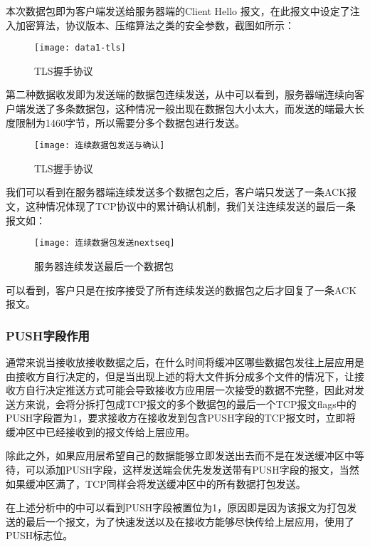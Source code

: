 \documentclass[lang=cn,11pt]{elegantpaper}
\begin{document}
本次数据包即为客户端发送给服务器端的Client  Hello 报文，在此报文中设定了注入加密算法，协议版本、压缩算法之类的安全参数，截图如所示：

\begin{figure}[htbp]
	\centering
	\texttt{[image: data1-tls]}
	\caption{TLS握手协议 \label{fig:11}}
\end{figure}

第二种数据收发即为发送端的数据包连续发送，从中可以看到，服务器端连续向客户端发送了多条数据包，这种情况一般出现在数据包大小太大，而发送的端最大长度限制为1460字节，所以需要分多个数据包进行发送。

\begin{figure}[htbp]
	\centering
	\texttt{[image: 连续数据包发送与确认]}
	\caption{TLS握手协议 \label{fig:14}}
\end{figure}

我们可以看到在服务器端连续发送多个数据包之后，客户端只发送了一条ACK报文，这种情况体现了TCP协议中的累计确认机制，我们关注连续发送的最后一条报文如：

\begin{figure}[htbp]
	\centering
	\texttt{[image: 连续数据包发送nextseq]}
	\caption{服务器连续发送最后一个数据包 \label{fig:12}}
\end{figure}

可以看到，客户只是在按序接受了所有连续发送的数据包之后才回复了一条ACK报文。

\subsubsection{PUSH字段作用}

通常来说当接收放接收数据之后，在什么时间将缓冲区哪些数据包发往上层应用是由接收方自行决定的，但是当出现上述的将大文件拆分成多个文件的情况下，让接收方自行决定推送方式可能会导致接收方应用层一次接受的数据不完整，因此对发送方来说，会将分拆打包成TCP报文的多个数据包的最后一个TCP报文flags中的PUSH字段置为1，要求接收方在接收发到包含PUSH字段的TCP报文时，立即将缓冲区中已经接收到的报文传给上层应用。

除此之外，如果应用层希望自己的数据能够立即发送出去而不是在发送缓冲区中等待，可以添加PUSH字段，这样发送端会优先发发送带有PUSH字段的报文，当然如果缓冲区满了，TCP同样会将发送缓冲区中的所有数据打包发送。

在上述分析中的中可以看到PUSH字段被置位为1，原因即是因为该报文为打包发送的最后一个报文，为了快速发送以及在接收方能够尽快传给上层应用，使用了PUSH标志位。
\end{document}
